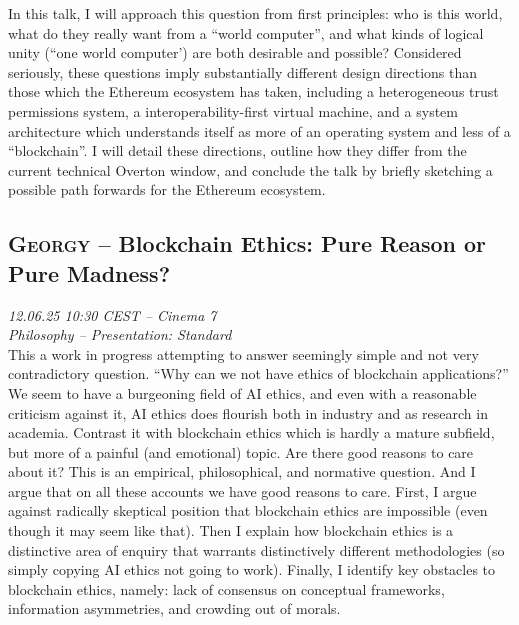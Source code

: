 In this talk, I will approach this question from first principles: who is this world, what do they really want from a ``world computer'', and what kinds of logical unity (``one world computer') are both desirable and possible? Considered seriously, these questions imply substantially different design directions than those which the Ethereum ecosystem has taken, including a heterogeneous trust permissions system, a interoperability-first virtual machine, and a system architecture which understands itself as more of an operating system and less of a ``blockchain''. I will detail these directions, outline how they differ from the current technical Overton window, and conclude the talk by briefly sketching a possible path forwards for the Ethereum ecosystem.

\clearpage
\subsection {\textsc{Georgy}  -- Blockchain Ethics: Pure Reason or Pure Madness?} \noindent \textit {12.06.25 10:30 CEST -- Cinema 7\\ Philosophy -- Presentation: Standard}\\[1em] This a work in progress attempting to answer seemingly simple and not very contradictory question.  ``Why can we not have ethics of blockchain applications?'' We seem to have a burgeoning field of AI ethics, and even with a reasonable criticism against it, AI ethics does flourish both in industry and as research in academia. Contrast it with blockchain ethics which is hardly a mature subfield, but more of a painful (and emotional) topic. Are there good reasons to care about it? This is an empirical, philosophical, and normative question. And I argue that on all these accounts we have good reasons to care. First, I argue against radically skeptical position that blockchain ethics are impossible (even though it may seem like that). Then I explain how blockchain ethics is a distinctive area of enquiry that warrants distinctively different methodologies (so simply copying AI ethics not going to work). Finally, I identify key obstacles to blockchain ethics, namely: lack of consensus on conceptual frameworks, information asymmetries, and crowding out of morals.

\clearpage
